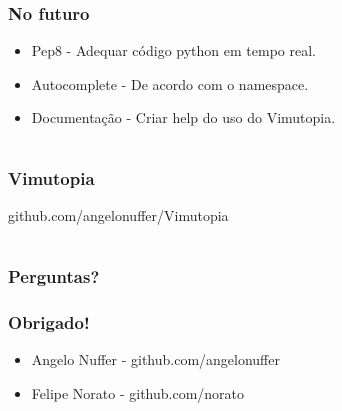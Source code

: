 \documentclass[]{beamer}
\begin{document}
\begin{frame}
    \frametitle{No futuro}
    \begin{itemize}
        \item<1-> Pep8 - Adequar código python em tempo real.
        \item<2-> Autocomplete - De acordo com o namespace.
        \item<3-> Documentação - Criar help do uso do Vimutopia.
    \end{itemize}
\end{frame}

\section[Vimutopia]{}

\begin{frame}
    \frametitle{Vimutopia}
             github.com/angelonuffer/Vimutopia
    \begin{center}
    \end{center}
\end{frame} 

\section[Perguntas?]{}

\begin{frame}
    \frametitle{Perguntas?}
    \begin{center}
    \end{center}
\end{frame}

\begin{frame}
    \frametitle{Obrigado!}
    \begin{itemize}
      \item Angelo Nuffer - github.com/angelonuffer
      \item Felipe Norato - github.com/norato
    \end{itemize}
\end{frame}
\end{document}
